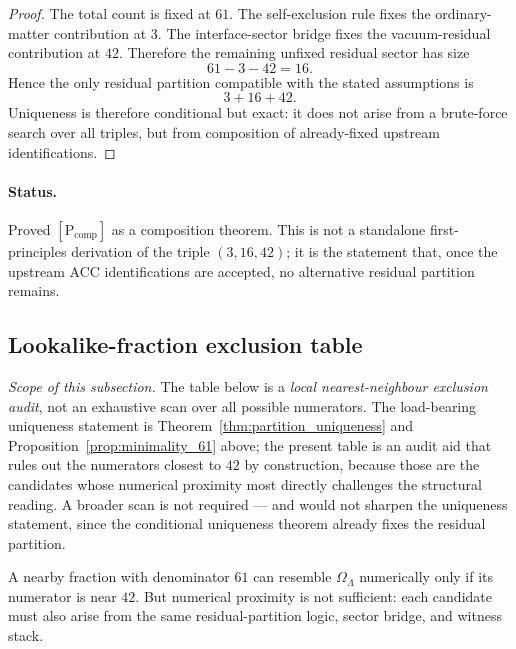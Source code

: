 \documentclass[11pt]{article}
\theoremstyle{plain}
\theoremstyle{definition}
\theoremstyle{remark}
\begin{document}
\begin{proof}
The total count is fixed at $61$.  The self-exclusion rule fixes the ordinary-matter contribution at $3$.  The interface-sector bridge fixes the vacuum-residual contribution at $42$.  Therefore the remaining unfixed residual sector has size
\[
  61 - 3 - 42 = 16.
\]
Hence the only residual partition compatible with the stated assumptions is
\[
  3 + 16 + 42.
\]
Uniqueness is therefore conditional but exact: it does not arise from a brute-force search over all triples, but from composition of already-fixed upstream identifications.
\end{proof}

\paragraph{Status.}
Proved $[\text{P}_{\mathrm{comp}}]$ as a composition theorem.  This is not a standalone first-principles derivation of the triple $(3, 16, 42)$; it is the statement that, once the upstream ACC identifications are accepted, no alternative residual partition remains.

\bigskip

\subsection{Lookalike-fraction exclusion table}\label{supp:I2}

\noindent\textit{Scope of this subsection.}  The table below is a \emph{local nearest-neighbour exclusion audit}, not an exhaustive scan over all possible numerators.  The load-bearing uniqueness statement is Theorem~\ref{thm:partition_uniqueness} and Proposition~\ref{prop:minimality_61} above; the present table is an audit aid that rules out the numerators closest to $42$ by construction, because those are the candidates whose numerical proximity most directly challenges the structural reading.  A broader scan is not required --- and would not sharpen the uniqueness statement, since the conditional uniqueness theorem already fixes the residual partition.

\bigskip

A nearby fraction with denominator $61$ can resemble $\Omega_\Lambda$ numerically only if its numerator is near $42$.  But numerical proximity is not sufficient: each candidate must also arise from the same residual-partition logic, sector bridge, and witness stack.
\end{document}
